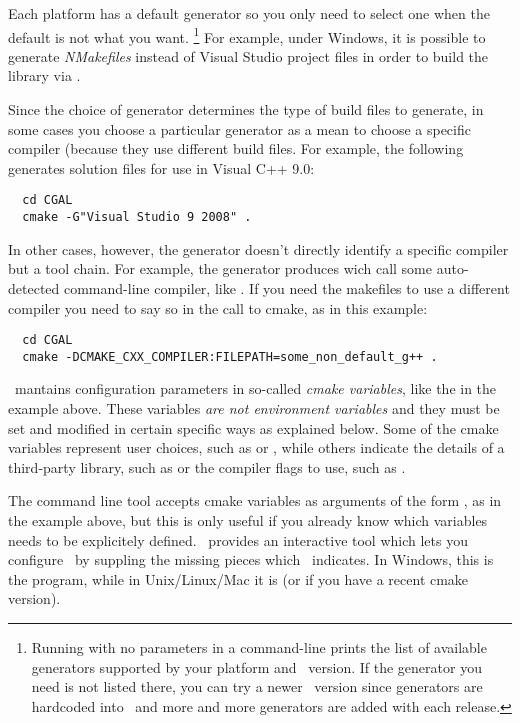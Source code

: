 Each platform has a default generator so you only need to select one when the default is
not what you want. 
\footnote{Running  with no parameters in a command-line prints the list of available generators supported 
by your platform and \cmake\ version. If the generator you need is not listed there, you can
try a newer \cmake\ version since generators are hardcoded into \cmake\ and more and
more generators are added with each release.}
For example, under Windows, it is possible to generate {\em NMakefiles}
instead of Visual Studio project files in order to build the library via .

Since the choice of generator determines the type of build files to generate, in some cases
you choose a particular generator as a mean to choose a specific compiler (because they use different 
build files. For example, the following generates solution files for use in Visual C++ 9.0:

{\ccTexHtml{\scriptsize}{}
\begin{verbatim}
  cd CGAL 
  cmake -G"Visual Studio 9 2008" . 
\end{verbatim}
}

In other cases, however, the generator doesn't directly identify a specific compiler but a tool chain.
For example, the  generator produces  wich call some auto-detected
command-line compiler, like . If you need the makefiles to use a different compiler you need to
say so in the call to cmake, as in this example:

{\ccTexHtml{\scriptsize}{}
\begin{verbatim}
  cd CGAL 
  cmake -DCMAKE_CXX_COMPILER:FILEPATH=some_non_default_g++ . 
\end{verbatim}
}


\cmake\ mantains configuration parameters in so-called {\em cmake variables}, like the 
in the example above. These variables {\em are not environment variables} and they must be set and modified in
certain specific ways as explained below. Some of the cmake variables represent user choices, such as
 or , while others indicate the details of a third-party library, 
such as  or the compiler flags to use, such as . 

The command line tool  accepts cmake variables as arguments of the form , as
in the example above, but this is only useful if you already know which variables needs to be explicitely defined.
\cmake\ provides an interactive tool which lets you configure \cgal\ by suppling the missing pieces 
which \cmake\ indicates. In Windows, this is the  program, while in Unix/Linux/Mac it is 
(or  if you have a recent cmake version). 

